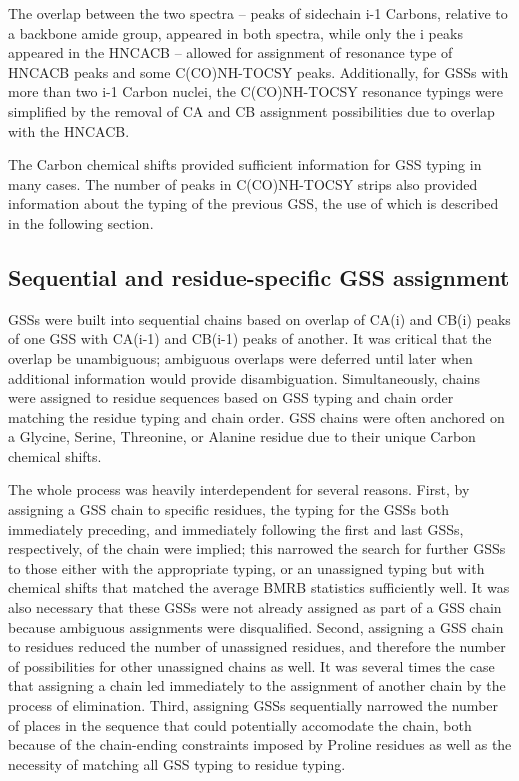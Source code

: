 The overlap between the two spectra -- peaks of sidechain i-1 Carbons, relative
to a backbone amide group, appeared in both spectra, while only the i peaks
appeared in the HNCACB -- allowed for assignment of resonance type of HNCACB
peaks and some C(CO)NH-TOCSY peaks.  Additionally, for GSSs with more than two
i-1 Carbon nuclei, the C(CO)NH-TOCSY resonance typings were simplified by the
removal of CA and CB assignment possibilities due to overlap with the HNCACB.

The Carbon chemical shifts provided sufficient information for GSS typing
in many cases.  The number of peaks in C(CO)NH-TOCSY strips also provided 
information about the typing of the previous GSS, the use of which is described
in the following section.

\subsection*{Sequential and residue-specific GSS assignment}
GSSs were built into sequential chains based on overlap of CA(i) and CB(i) 
peaks of one GSS with CA(i-1) and CB(i-1) peaks of another.  It was critical
that the overlap be unambiguous; ambiguous overlaps were deferred until later
when additional information would provide disambiguation.
Simultaneously, chains were assigned to residue sequences based on GSS typing
and chain order matching the residue typing and chain order.  GSS chains
were often anchored on a Glycine, Serine, Threonine, or Alanine residue due
to their unique Carbon chemical shifts.

The whole process was heavily interdependent for several reasons.  First, by
assigning a GSS chain to specific residues, the typing for the GSSs both
immediately preceding, and immediately following the first and last GSSs,
respectively, of the chain were implied; this narrowed the search for further
GSSs to those either with the appropriate typing, or an unassigned typing but
with chemical shifts that matched the average BMRB statistics sufficiently 
well.  It was also necessary that these GSSs were not already assigned as 
part of a GSS chain because ambiguous assignments were disqualified.
Second, assigning a GSS chain to residues reduced the number of unassigned
residues, and therefore the number of possibilities for other unassigned chains
as well.  It was several times the case that assigning a chain led immediately
to the assignment of another chain by the process of elimination.  Third,
assigning GSSs sequentially narrowed the number of places in the sequence that
could potentially accomodate the chain, both because of the chain-ending
constraints imposed by Proline residues as well as the necessity of matching
all GSS typing to residue typing.

